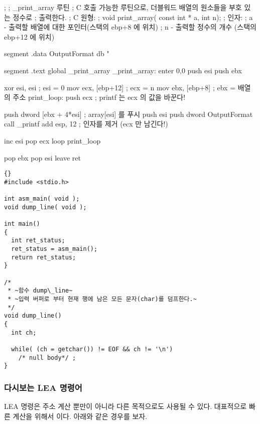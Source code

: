 \begin{AsmCodeListing}[label=array1.asm]
;
; _print_array 루틴
; C 호출 가능한 루틴으로, 더블워드 배열의 원소들을 부호 있는 정수로 
; 출력한다. 
; C 원형:
; void print_array( const int * a, int n);
; 인자:
;   a - 출력할 배열에 대한 포인터(스택의 ebp+8 에 위치)
;   n - 출력할 정수의 개수 (스택의 ebp+12 에 위치)

segment .data
OutputFormat    db   "%

segment .text
        global  _print_array
_print_array:
        enter   0,0
        push    esi
        push    ebx

        xor     esi, esi                  ; esi = 0
        mov     ecx, [ebp+12]             ; ecx = n
        mov     ebx, [ebp+8]              ; ebx = 배열의 주소
print_loop:
        push    ecx                       ; printf 는 ecx 의 값을 바꾼다!

        push    dword [ebx + 4*esi]       ; array[esi] 를 푸시
        push    esi
        push    dword OutputFormat
        call    _printf
        add     esp, 12                   ; 인자를 제거 (ecx 만 남긴다!)

        inc     esi
        pop     ecx
        loop    print_loop

        pop     ebx
        pop     esi
        leave
        ret
\end{AsmCodeListing}

\begin{lstlisting}[escapeinside=~~]{}
#include <stdio.h>

int asm_main( void );
void dump_line( void );

int main()
{
  int ret_status;
  ret_status = asm_main();
  return ret_status;
}

/*
 * ~함수 dump\_line~ 
 * ~입력 버퍼로 부터 현재 행에 남은 모든 문자(char)를 덤프한다.~ 
 */
void dump_line()
{
  int ch;

  while( (ch = getchar()) != EOF && ch != '\n')
    /* null body*/ ;
}
\end{lstlisting}

\subsubsection{다시보는 {\code LEA} 명령어 }

{\code LEA} 명령은 주소 계산 뿐만이 아니라 다른 목적으로도 사용될 수 있다. 대표적으로
빠른 계산을 위해서 이다. 아래와 같은 경우를 보자. 

